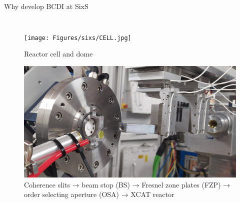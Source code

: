 \begin{frame}{Why develop BCDI at SixS}
\begin{columns}
            \begin{figure}
                \centering
                \texttt{[image: Figures/sixs/CELL.jpg]}
                \caption{Reactor cell and dome}
                \label{fig:CELLDome}
                \bigskip
                \pause
                \includegraphics[width=\textwidth]{Figures/sixs/opt_elements_photo.jpg}
                \caption{Coherence slits → beam stop (BS) → Fresnel zone plates (FZP) → order selecting aperture (OSA) → XCAT reactor}
                \label{fig:3Doptics}
            \end{figure}

    \end{columns}
\end{frame}